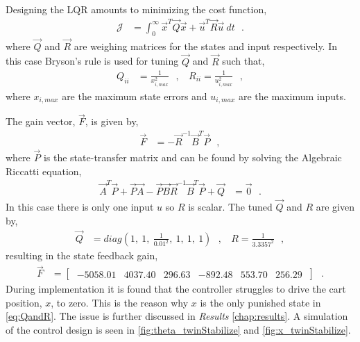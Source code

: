 Designing the LQR amounts to minimizing the cost function,
\begin{align}
\mathcal{J} &= \int_{0}^{\infty} \vec{x}^T \vec{Q} \vec{x} + \vec{u}^T \vec{R} \vec{u} \ dt \ \ \ .
\label{eq:costFunctionLQR}
\end{align}
where $\vec{Q}$ and $\vec{R}$ are weighing matrices for the states and input respectively. In this case Bryson's rule is used for tuning $\vec{Q}$ and $\vec{R}$ such that,
\begin{align}
  Q_{ii} &= \frac{1}{x_{i,max}^2 }  \ \ \ , \ \ \ \ R_{ii} = \frac{1}{u_{i,max}^2 } \ \ \ ,
\end{align}
where $x_{i,max}$ are the maximum state errors and $u_{i,max}$ are the maximum inputs.

The gain vector, $\vec{F}$, is given by,
\begin{align} 
\vec{F} &= -\vec{R}^{-1}\vec{B}^T\vec{P} \ \ \ ,
\label{eq:gainAndStateTransferMatrix}
\end{align}
where $\vec{P}$ is the state-transfer matrix and can be found by solving the Algebraic Riccatti equation,
\begin{align} 
\vec{A}^T\vec{P}+\vec{P}\vec{A}-\vec{P}\vec{B}\vec{R}^{-1}\vec{B}^T\vec{P}+\vec{Q} &= \vec{0} \ \ \ .
\label{eq:algebraicRiccattiEquation}
\end{align}
%
%
%
In this case there is only one input $u$ so $R$ is scalar. The tuned $\vec{Q}$ and $R$ are given by,
\begin{align}
  \vec{Q} &= diag( 1,\ 1,\ \frac{1}{ 0.01^2 },\ 1,\ 1,\ 1 )  \ \ \ , \ \ \ \
  R        = \frac{1}{ 3.3357^2 } \ \ \ , \label{eq:QandR}
\end{align}
%
resulting in the state feedback gain,
%
\begin{align}
\vec{F} &= [\ 
             \begin{matrix}
               -5058.01 & 4037.40 & 296.63 & -892.48 & 553.70 & 256.29
             \end{matrix}
         \ ] \ \ \ .
\end{align}
%
During implementation it is found that the controller struggles to drive the cart position, $x$, to zero. This is the reason why $x$ is the only punished state in \autoref{eq:QandR}. The issue is further discussed in \textit{Results} \autoref{chap:results}. A simulation of the control design is seen in \autoref{fig:theta_twinStabilize} and \ref{fig:x_twinStabilize}.
